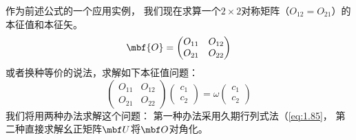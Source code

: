 作为前述公式的一个应用实例，
我们现在求算一个$2\times 2$对称矩阵（$O_{12}=O_{21}$）的本征值和本征矢。
\[\mbf{O} = \begin{pmatrix}
 O_{11} & O_{12} \\ O_{21} & O_{22}
\end{pmatrix}\]
或者换种等价的说法，求解如下本征值问题：
\begin{equation}
 \begin{pmatrix}
     O_{11} & O_{12} \\ O_{21} &O_{22}
 \end{pmatrix} \begin{pmatrix}
     c_1 \\ c_2
 \end{pmatrix} = \omega \begin{pmatrix}
     c_1 \\ c_2
 \end{pmatrix}
 \label{eq:1.94}
\end{equation}
我们将用两种办法求解这个问题：
第一种办法采用久期行列式法（\autoref{eq:1.85}，
第二种直接求解幺正矩阵$\mbf U$将$\mbf O$对角化。


